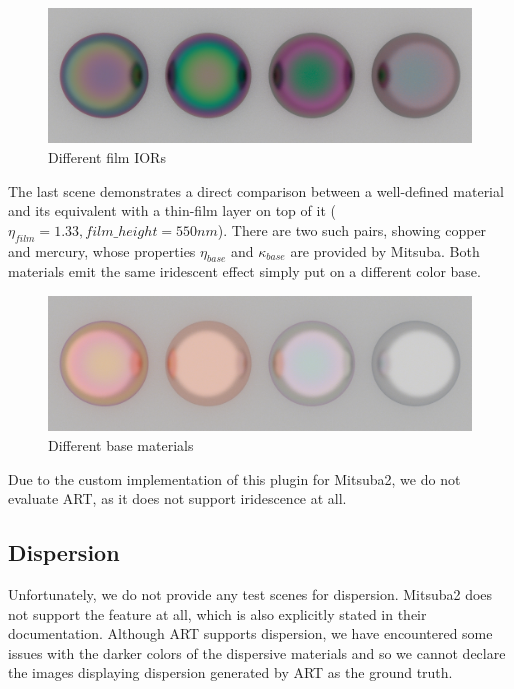 \begin{description}
\begin{figure}[H]
		\centering
		\includegraphics[width=.9\linewidth]{img/iridescent_spheres_film.png}
		\caption{Different film IORs}
		\label{fig:irid_ior}
	\end{figure}
	\item[Materials~\ref{fig:irid_mat}] The last scene demonstrates a direct comparison between a well-defined material and its equivalent with a thin-film layer on top of it ($\eta_{film}=1.33,film\_height=550nm$). There are two such pairs, showing copper and mercury, whose properties $\eta_{base}$ and $\kappa_{base}$ are provided by Mitsuba. Both materials emit the same iridescent effect simply put on a different color base.
	\begin{figure}[H]
		\centering
		\includegraphics[width=.9\linewidth]{img/iridescent_spheres_materials.png}
		\caption{Different base materials}
		\label{fig:irid_mat}
	\end{figure}
\end{description}

Due to the custom implementation of this plugin for Mitsuba2, we do not evaluate ART, as it does not support iridescence at all.

\subsection{Dispersion}

Unfortunately, we do not provide any test scenes for dispersion. Mitsuba2 does not support the feature at all, which is also explicitly stated in their documentation. Although ART supports dispersion, we have encountered some issues with the darker colors of the dispersive materials and so we cannot declare the images displaying dispersion generated by ART as the ground truth.

